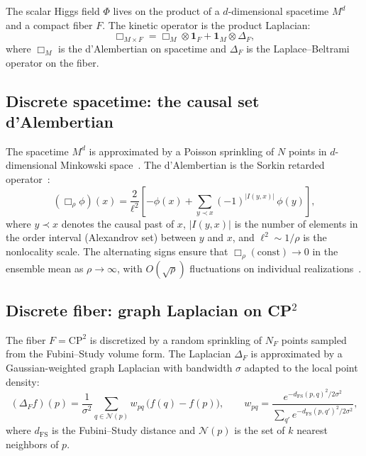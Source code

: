 \documentclass[12pt,a4paper]{article}
\begin{document}
The scalar Higgs field $\Phi$ lives on the product of a $d$-dimensional
spacetime $M^d$ and a compact fiber $F$.  The kinetic operator is the
product Laplacian:
\begin{equation}
  \Box_{M \times F} = \Box_M \otimes \mathbf{1}_F + \mathbf{1}_M \otimes \Delta_F,
  \label{eq:product_box}
\end{equation}
where $\Box_M$ is the d'Alembertian on spacetime and $\Delta_F$ is
the Laplace--Beltrami operator on the fiber.

\subsection{Discrete spacetime: the causal set d'Alembertian}

The spacetime $M^d$ is approximated by a Poisson sprinkling of $N$
points in $d$-dimensional Minkowski space~\cite{bombelli,sorkin}.
The d'Alembertian is the Sorkin retarded
operator~\cite{sorkin_box,benincasa_dowker}:
\begin{equation}
  (\Box_\rho \phi)(x) = \frac{2}{\ell^2} \left[
    -\phi(x) + \sum_{y \prec x} (-1)^{|I(y,x)|}\, \phi(y)
  \right],
  \label{eq:bd_box}
\end{equation}
where $y \prec x$ denotes the causal past of $x$, $|I(y,x)|$ is the
number of elements in the order interval (Alexandrov set) between $y$
and $x$, and $\ell^2 \sim 1/\rho$ is the nonlocality scale.  The
alternating signs ensure that $\Box_\rho(\text{const}) \to 0$ in the
ensemble mean as $\rho \to \infty$, with $O(\sqrt{\rho})$ fluctuations
on individual realizations~\cite{sorkin_box}.

\subsection{Discrete fiber: graph Laplacian on CP$^2$}

The fiber $F = \text{CP}^2$ is discretized by a random sprinkling of
$N_F$ points sampled from the Fubini--Study volume form.  The Laplacian
$\Delta_F$ is approximated by a Gaussian-weighted graph Laplacian with
bandwidth $\sigma$ adapted to the local point density:
\begin{equation}
  (\Delta_F f)(p) = \frac{1}{\sigma^2} \sum_{q \in \mathcal{N}(p)}
    w_{pq}\, \bigl(f(q) - f(p)\bigr),
  \qquad
  w_{pq} = \frac{e^{-d_{\text{FS}}(p,q)^2 / 2\sigma^2}}
               {\sum_{q'} e^{-d_{\text{FS}}(p,q')^2 / 2\sigma^2}},
\end{equation}
where $d_{\text{FS}}$ is the Fubini--Study distance and $\mathcal{N}(p)$
is the set of $k$ nearest neighbors of $p$.
\end{document}
